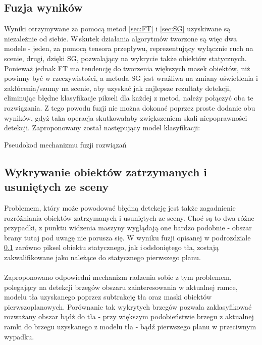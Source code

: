 \subsection{Fuzja wyników}
\label{sec:fuzja}
Wyniki otrzymywane za pomocą metod \ref{sec:FT} i \ref{sec:SG} uzyskiwane są niezależnie od siebie. W\,skutek działania algorytmów tworzone są więc dwa modele - jeden, za pomocą tensora przepływu, reprezentujący wyłącznie ruch na scenie, drugi, dzięki SG, pozwalający na wykrycie także obiektów statycznych. Ponieważ jednak FT ma tendencję do tworzenia większych masek obiektów, niż powinny być w rzeczywistości, a metoda SG jest wrażliwa na zmiany oświetlenia i zakłócenia/szumy na scenie, aby uzyskać jak najlepsze rezultaty detekcji, eliminując błędne klasyfikacje pikseli dla każdej z metod, należy połączyć oba te rozwiązania. Z tego powodu fuzji nie można dokonać poprzez proste dodanie obu wyników, gdyż taka operacja skutkowałaby zwiększeniem skali niepoprawności detekcji. Zaproponowany został następujący model klasyfikacji: \\
\begin{algorithm}[H]
 \caption{Pseudokod mechanizmu fuzji rozwiązań}
\end{algorithm}
\subsection{Wykrywanie obiektów zatrzymanych i usuniętych ze sceny}
Problemem, który może powodować błędną detekcję jest także zagadnienie rozróżniania obiektów zatrzymanych i usuniętych ze sceny. Choć są to dwa różne przypadki, z punktu widzenia maszyny wyglądają one bardzo podobnie - obszar brany tutaj pod uwagę nie porusza się. W wyniku fuzji opisanej w podrozdziale \ref{sec:fuzja} zarówno piksel obiektu statycznego, jak i\,odsłoniętego tła, zostają zakwalifikowane jako należące do statycznego pierwszego planu.
\paragraph{}
Zaproponowano odpowiedni mechanizm radzenia sobie z tym problemem, polegający na detekcji brzegów obszaru zainteresowania w aktualnej ramce, modelu tła uzyskanego poprzez subtrakcję tła oraz maski obiektów pierwszoplanowych. Porównanie tak wykrytych brzegów pozwala zaklasyfikować rozważany obszar bądź do tła - przy większym podobieństwie brzegu z aktualnej ramki do brzegu uzyskanego z modelu tła - bądź pierwszego planu w przeciwnym wypadku.
